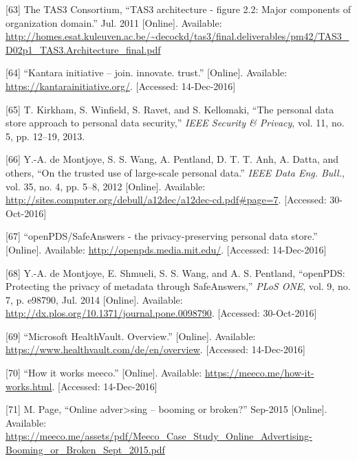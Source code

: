 \documentclass[12pt,english,a4paper,titlepage,cleardoublepage=empty,dottedtoc]{report}
\begin{document}
\hypertarget{ref-graphic_2011_architecture_components-of-organization-domain}{}
{[}63{]} The TAS3 Consortium, ``TAS3 architecture - figure 2.2: Major
components of organization domain.'' Jul. 2011 {[}Online{]}. Available:
\url{http://homes.esat.kuleuven.ac.be/~decockd/tas3/final.deliverables/pm42/TAS3_D02p1_TAS3.Architecture_final.pdf}

\hypertarget{ref-web_kantara-initiative}{}
{[}64{]} ``Kantara initiative -- join. innovate. trust.'' {[}Online{]}.
Available: \url{https://kantarainitiative.org/}. {[}Accessed:
14-Dec-2016{]}

\hypertarget{ref-paper_2014_personal-data-store-approach}{}
{[}65{]} T. Kirkham, S. Winfield, S. Ravet, and S. Kellomaki, ``The
personal data store approach to personal data security,'' \emph{IEEE
Security \& Privacy}, vol. 11, no. 5, pp. 12--19, 2013.

\hypertarget{ref-paper_2012_openpds_on-trusted-use-of-large-scale-personal-data}{}
{[}66{]} Y.-A. de Montjoye, S. S. Wang, A. Pentland, D. T. T. Anh, A.
Datta, and others, ``On the trusted use of large-scale personal data.''
\emph{IEEE Data Eng. Bull.}, vol. 35, no. 4, pp. 5--8, 2012
{[}Online{]}. Available:
\url{http://sites.computer.org/debull/a12dec/a12dec-cd.pdf\#page=7}.
{[}Accessed: 30-Oct-2016{]}

\hypertarget{ref-web_mit_openpds-safeanswers-project-page}{}
{[}67{]} ``openPDS/SafeAnswers - the privacy-preserving personal data
store.'' {[}Online{]}. Available: \url{http://openpds.media.mit.edu/}.
{[}Accessed: 14-Dec-2016{]}

\hypertarget{ref-paper_2014_openpds_protecting-privacy-of-meta-data-through-safeanswers}{}
{[}68{]} Y.-A. de Montjoye, E. Shmueli, S. S. Wang, and A. S. Pentland,
``openPDS: Protecting the privacy of metadata through SafeAnswers,''
\emph{PLoS ONE}, vol. 9, no. 7, p. e98790, Jul. 2014 {[}Online{]}.
Available: \url{http://dx.plos.org/10.1371/journal.pone.0098790}.
{[}Accessed: 30-Oct-2016{]}

\hypertarget{ref-web_microsoft_healthvault}{}
{[}69{]} ``Microsoft HealthVault. Overview.'' {[}Online{]}. Available:
\url{https://www.healthvault.com/de/en/overview}. {[}Accessed:
14-Dec-2016{]}

\hypertarget{ref-web_meeco_how-it-works}{}
{[}70{]} ``How it works meeco.'' {[}Online{]}. Available:
\url{https://meeco.me/how-it-works.html}. {[}Accessed: 14-Dec-2016{]}

\hypertarget{ref-slides_2015_meeco-case-study}{}
{[}71{]} M. Page, ``Online adver\textgreater{}sing -- booming or
broken?'' Sep-2015 {[}Online{]}. Available:
\url{https://meeco.me/assets/pdf/Meeco_Case_Study_Online_Advertising-Booming_or_Broken_Sept_2015.pdf}
\end{document}
